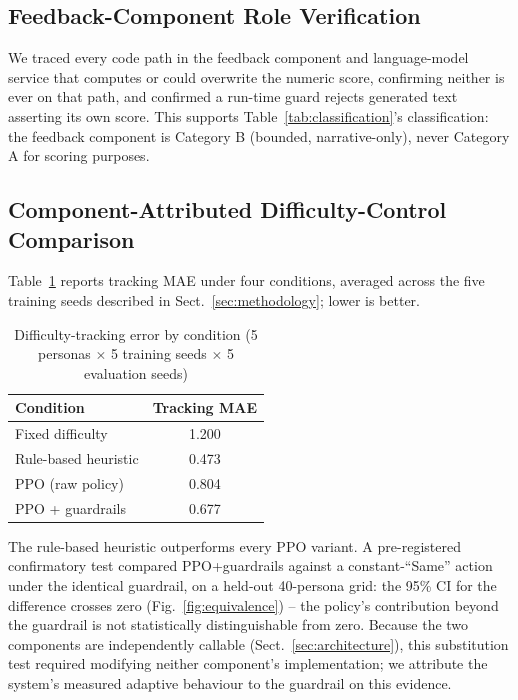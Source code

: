 \documentclass[runningheads]{llncs}
\begin{document}
\subsection{Feedback-Component Role Verification}

We traced every code path in the feedback component and language-model service that computes or could overwrite the numeric score, confirming neither is ever on that path, and confirmed a run-time guard rejects generated text asserting its own score. This supports Table~\ref{tab:classification}'s classification: the feedback component is Category B (bounded, narrative-only), never Category A for scoring purposes.

\subsection{Component-Attributed Difficulty-Control Comparison}
\label{sec:rl-attribution}

Table~\ref{tab:mae} reports tracking MAE under four conditions, averaged across the five training seeds described in Sect.~\ref{sec:methodology}; lower is better.

\begin{table}[t]
\centering
\caption{Difficulty-tracking error by condition (5 personas $\times$ 5 training seeds $\times$ 5 evaluation seeds)}
\label{tab:mae}
\begin{tabular}{lc}
\toprule
\textbf{Condition} & \textbf{Tracking MAE} \\
\midrule
Fixed difficulty & 1.200 \\
Rule-based heuristic & 0.473 \\
PPO (raw policy) & 0.804 \\
PPO + guardrails & 0.677 \\
\bottomrule
\end{tabular}
\end{table}

The rule-based heuristic outperforms every PPO variant. A pre-registered confirmatory test compared PPO+guardrails against a constant-``Same'' action under the identical guardrail, on a held-out 40-persona grid: the 95\% CI for the difference crosses zero (Fig.~\ref{fig:equivalence}) -- the policy's contribution beyond the guardrail is not statistically distinguishable from zero. Because the two components are independently callable (Sect.~\ref{sec:architecture}), this substitution test required modifying neither component's implementation; we attribute the system's measured adaptive behaviour to the guardrail on this evidence.
\end{document}
